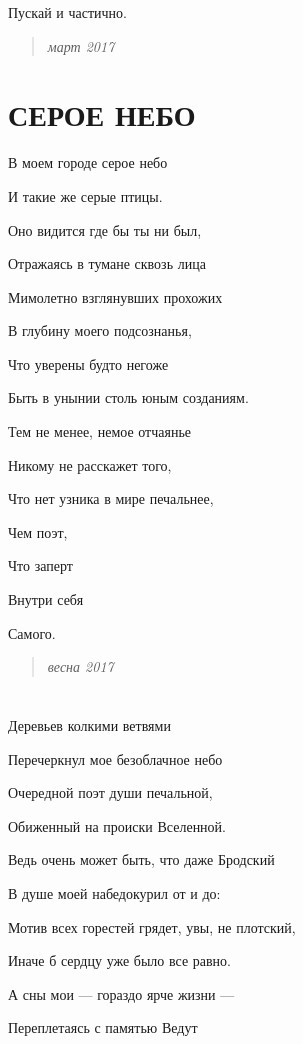 \documentclass[
  a5paperpaper,
  DIV=11,
  numbers=noendperiod]{scrreprt}
\begin{document}
Пускай и частично.

\begin{quote}
\emph{март 2017}
\end{quote}

\section{СЕРОЕ
НЕБО}\label{ux441ux435ux440ux43eux435-ux43dux435ux431ux43e}

В моем городе серое небо

И такие же серые птицы.

Оно видится где бы ты ни был,

Отражаясь в тумане сквозь лица

Мимолетно взглянувших прохожих

В глубину моего подсознанья,

Что уверены будто негоже

Быть в унынии столь юным созданиям.

Тем не менее, немое отчаянье

Никому не расскажет того,

Что нет узника в мире печальнее,

Чем поэт,

Что заперт

Внутри себя

Самого.

\begin{quote}
\emph{весна 2017}
\end{quote}

\section{}\label{section-7}

Деревьев колкими ветвями

Перечеркнул мое безоблачное небо

Очередной поэт души печальной,

Обиженный на происки Вселенной.

Ведь очень может быть, что даже Бродский

В душе моей набедокурил от и до:

Мотив всех горестей грядет, увы, не плотский,

Иначе б сердцу уже было все равно.

А сны мои --- гораздо ярче жизни ---

Переплетаясь с памятью Ведут
\end{document}
